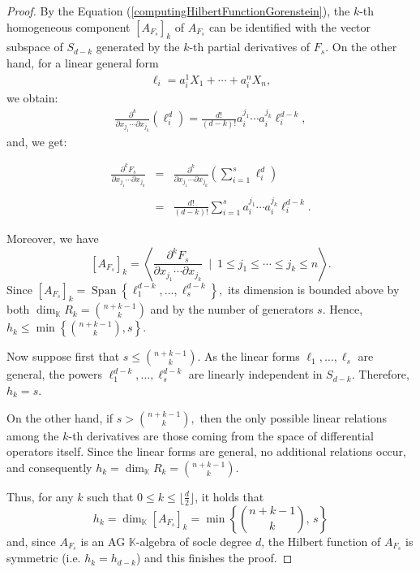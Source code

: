 \documentclass[12pt,twoside]{amsart}
\numberwithin{equation}{section} \hyphenation{semi-stable}
\newcommand{\K}{\mathbb{K}}
\theoremstyle{definition}
\begin{document}
\begin{proof}
  By the Equation (\ref{computingHilbertFunctionGorenstein}), the $k$-th homogeneous component $[A_{F_s}]_k$ of  $A_{F_s}$ can be  identified with the vector subspace of $S_{d-k}$
generated by the  $k$-th  partial derivatives of $F_s$. On the other hand, for a linear general form
\begin{eqnarray*}
\ell_i=a_{i}^1X_1+\cdots+a_{i}^nX_n,
\end{eqnarray*}
we obtain:
\begin{eqnarray*}
\frac{\partial^k}{\partial x_{j_1}\cdots\partial x_{j_k}}(\ell_i^d)
=
\frac{d!}{(d-k)!}
a_{i}^{j_1}\cdots a_{i}^{j_k}\ell_i^{d-k},
\end{eqnarray*}
and, we get:

$$
\begin{array}{rcl}
\frac{\partial^kF_s}{\partial x_{j_1}\cdots\partial x_{j_k}} &
= & 
\frac{\partial^k}{\partial x_{j_1}\cdots\partial x_{j_k}}(\sum _{i=1}^s\ell_i^d )\\  \\
& = &
\frac{d!}{(d-k)!}\sum _{i=1}^s
a_{i}^{j_1}\cdots a_{i}^{j_k}\ell_i^{d-k}.
\end{array}
$$

Moreover, we have
$$[A_{F_s}]_k=\left \langle  \frac{\partial^kF_s}{\partial x_{j_1}\cdots\partial x_{j_k}} \ \mid  \ 1\le j_1\le \cdots \le j_k\le n   \right\rangle .$$
Since $\left[A_{F_s}\right]_k=\operatorname{Span}\left\{\ell_1^{d-k}, \ldots, \ell_s^{d-k}\right\},$ its dimension is bounded above by both $\operatorname{dim}_{\mathbb{K}} R_k=\binom{n+k-1}{k}$ and by the number of generators $s$. Hence, $h_k \leq \min \left\{\binom{n+k-1}{k}, s\right\}.$

Now suppose first that
$s \leq\binom{ n+k-1}{k}$. As the linear forms $\ell_1, \ldots, \ell_s$ are general, the powers $\ell_1^{d-k}, \ldots, \ell_s^{d-k}$
are linearly independent in $S_{d-k}$. Therefore, $h_k=s.$

On the other hand, if $s > \binom{n+k-1}{k},$ then the only possible linear relations among the $k$-th derivatives are those coming from the space of differential operators itself. Since the linear forms are general, no additional relations occur, and consequently $h_k=\operatorname{dim}_{\mathbb{K}} R_k=\binom{n+k-1}{k}.$

Thus, for any $k$ such that $0\leq k\leq\lfloor\frac{d}{2}\rfloor$, it holds that
$$h_k=\dim_{\mathbb K}[A_{F_{s}}]_k
=\min\left\{\binom{n+k-1}{k},\, s\right\} $$
and, since $A_{F_s}$ is an AG $\K$-algebra  of socle degree $d$, the Hilbert function of $A_{F_s}$ is symmetric (i.e. $h_k = h_{d-k}$) and this finishes the proof. 
\end{proof}
\end{document}
